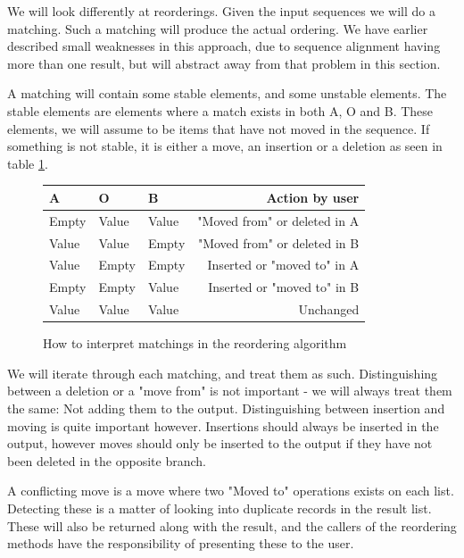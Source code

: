 \documentclass[11pt]{article}
\begin{document}
We will look differently at reorderings. Given the input sequences we will do a matching. Such a matching will produce the actual ordering. We have earlier described small weaknesses in this approach, due to sequence alignment having more than one result, but will abstract away from that problem in this section.

A matching will contain some stable elements, and some unstable elements. The stable elements are elements where a match exists in both A, O and B. These elements, we will assume to be items that have not moved in the sequence. If something is not stable, it is either a move, an insertion or a deletion as seen in table \ref{ReorderingTable}.


\begin{figure}
\label{ReorderingTable}
\centering
\begin{tabular}{ | l | l | l || r |}
  \hline                        
   \textbf{A} & \textbf{O} & \textbf{B} & \textbf{Action by user} \\
  \hline                        
  Empty & Value & Value & "Moved from" or deleted in A \\
  Value & Value & Empty & "Moved from" or deleted in B \\
  Value & Empty & Empty & Inserted or "moved to" in A \\
  Empty & Empty & Value & Inserted or "moved to" in B \\
  Value & Value & Value & Unchanged \\
  \hline  
\end{tabular}
  \caption{How to interpret matchings in the reordering algorithm}
\end{figure}

We will iterate through each matching, and treat them as such. Distinguishing between a deletion or a "move from" is not important - we will always treat them the same: Not adding them to the output. Distinguishing between insertion and moving is quite important however. Insertions should always be inserted in the output, however moves should only be inserted to the output if they have not been deleted in the opposite branch. 

A conflicting move is a move where two "Moved to" operations exists on each list. Detecting these is a matter of looking into duplicate records in the result list. These will also be returned along with the result, and the callers of the reordering methods have the responsibility of presenting these to the user.
\end{document}
